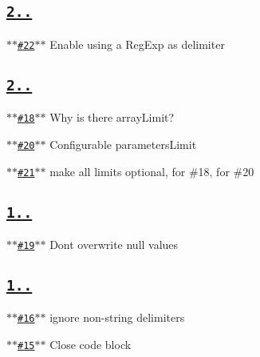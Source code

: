 \subsection*{\href{https://github.com/ljharb/qs/issues?milestone=8&state=closed}{\tt {\bfseries 2..}}}


\begin{DoxyItemize}
\item \href{https://github.com/ljharb/qs/issues/22}{\tt $\ast$$\ast$\#22$\ast$$\ast$} Enable using a Reg\+Exp as delimiter
\end{DoxyItemize}

\subsection*{\href{https://github.com/ljharb/qs/issues?milestone=7&state=closed}{\tt {\bfseries 2..}}}


\begin{DoxyItemize}
\item \href{https://github.com/ljharb/qs/issues/18}{\tt $\ast$$\ast$\#18$\ast$$\ast$} Why is there array\+Limit?
\item \href{https://github.com/ljharb/qs/issues/20}{\tt $\ast$$\ast$\#20$\ast$$\ast$} Configurable parameters\+Limit
\item \href{https://github.com/ljharb/qs/issues/21}{\tt $\ast$$\ast$\#21$\ast$$\ast$} make all limits optional, for \#18, for \#20
\end{DoxyItemize}

\subsection*{\href{https://github.com/ljharb/qs/issues?milestone=6&state=closed}{\tt {\bfseries 1..}}}


\begin{DoxyItemize}
\item \href{https://github.com/ljharb/qs/issues/19}{\tt $\ast$$\ast$\#19$\ast$$\ast$} Don\textquotesingle{}t overwrite null values
\end{DoxyItemize}

\subsection*{\href{https://github.com/ljharb/qs/issues?milestone=5&state=closed}{\tt {\bfseries 1..}}}


\begin{DoxyItemize}
\item \href{https://github.com/ljharb/qs/issues/16}{\tt $\ast$$\ast$\#16$\ast$$\ast$} ignore non-\/string delimiters
\item \href{https://github.com/ljharb/qs/issues/15}{\tt $\ast$$\ast$\#15$\ast$$\ast$} Close code block
\end{DoxyItemize}

